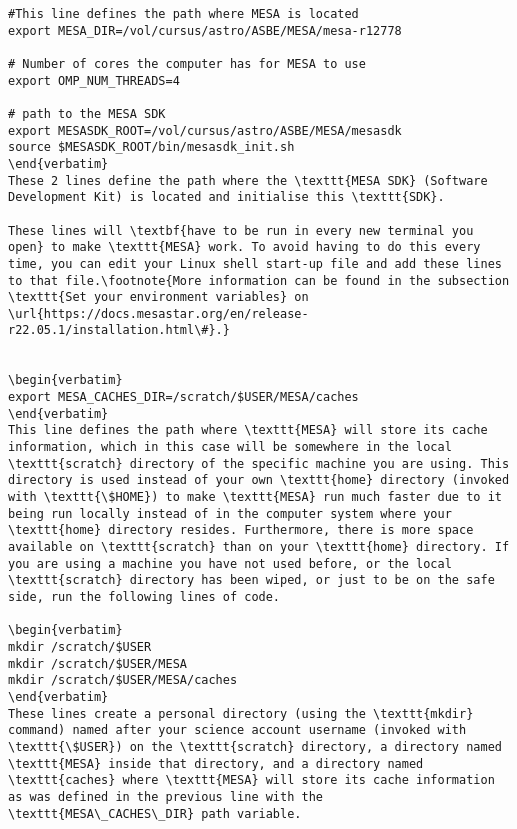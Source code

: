\documentclass[11pt,a4paper]{article}
\begin{document}
\begin{lstlisting}
#This line defines the path where MESA is located 
export MESA_DIR=/vol/cursus/astro/ASBE/MESA/mesa-r12778

# Number of cores the computer has for MESA to use
export OMP_NUM_THREADS=4

# path to the MESA SDK
export MESASDK_ROOT=/vol/cursus/astro/ASBE/MESA/mesasdk
source $MESASDK_ROOT/bin/mesasdk_init.sh
\end{verbatim}
These 2 lines define the path where the \texttt{MESA SDK} (Software Development Kit) is located and initialise this \texttt{SDK}. 

These lines will \textbf{have to be run in every new terminal you open} to make \texttt{MESA} work. To avoid having to do this every time, you can edit your Linux shell start-up file and add these lines to that file.\footnote{More information can be found in the subsection \texttt{Set your environment variables} on \url{https://docs.mesastar.org/en/release-r22.05.1/installation.html\#}.}


\begin{verbatim}
export MESA_CACHES_DIR=/scratch/$USER/MESA/caches
\end{verbatim}
This line defines the path where \texttt{MESA} will store its cache information, which in this case will be somewhere in the local \texttt{scratch} directory of the specific machine you are using. This directory is used instead of your own \texttt{home} directory (invoked with \texttt{\$HOME}) to make \texttt{MESA} run much faster due to it being run locally instead of in the computer system where your \texttt{home} directory resides. Furthermore, there is more space available on \texttt{scratch} than on your \texttt{home} directory. If you are using a machine you have not used before, or the local \texttt{scratch} directory has been wiped, or just to be on the safe side, run the following lines of code. 

\begin{verbatim}
mkdir /scratch/$USER
mkdir /scratch/$USER/MESA
mkdir /scratch/$USER/MESA/caches
\end{verbatim}
These lines create a personal directory (using the \texttt{mkdir} command) named after your science account username (invoked with \texttt{\$USER}) on the \texttt{scratch} directory, a directory named \texttt{MESA} inside that directory, and a directory named \texttt{caches} where \texttt{MESA} will store its cache information as was defined in the previous line with the \texttt{MESA\_CACHES\_DIR} path variable.


\end{lstlisting}
\end{document}
